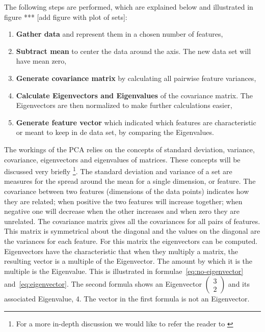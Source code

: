 The following steps are performed, which are explained below and illustrated in figure *** [add figure with plot of sets]:

\begin{enumerate}
	\item \textbf{Gather data} and represent them in a chosen number of features,
	\item \textbf{Subtract mean} to center the data around the axis. The new data set will have mean zero,
	\item \textbf{Generate covariance matrix} by calculating all pairwise feature variances,
	\item \textbf{Calculate Eigenvectors and Eigenvalues} of the covariance matrix.
	The Eigenvectors are then normalized to make further calculations easier,
	\item \textbf{Generate feature vector} which indicated which features are characteristic or meant to keep in de data set, by comparing the Eigenvalues.
\end{enumerate}

The workings of the PCA \cite{smith2002tutorial} relies on the concepts of standard deviation, variance, covariance, eigenvectors and eigenvalues of matrices.
These concepts will be discussed very briefly \footnote{For a more in-depth discussion we would like to refer the reader to \cite{jolliffe2005principal}}.
The standard deviation and variance of a set are measures for the spread around the mean for a single dimension, or feature.
The covariance between two features (dimensions of the data points) indicates how they are related; when positive the two features will increase together; when negative one will decrease when the other increases and when zero they are unrelated.
The covariance matrix gives all the covariances for all pairs of features.
This matrix is symmetrical about the diagonal and the values on the diagonal are the variances for each feature.
For this matrix the eigenvectors can be computed. Eigenvectors have the characteristic that when they multiply a matrix, the resulting vector is a multiple of the Eigenvector.
The amount by which it is the multiple is the Eigenvalue.
This is illustrated in formulae~\ref{eq:no-eigenvector} and~\ref{eq:eigenvector}.
The second formula shows an Eigenvector $ \left( \begin{smallmatrix} 3 \\ 2 \end{smallmatrix} \right)$ and its associated Eigenvalue, 4.
The vector in the first formula is not an Eigenvector.

